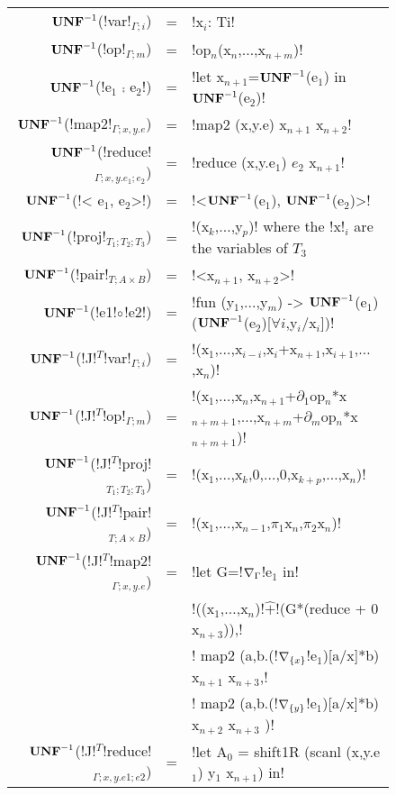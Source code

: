 \begin{figure*}[t]
    \begin{tabular}{|r c l|}
    \hline
    $\mathbf{UNF}^{-1}$(!var!$_{\Gamma;i}$) &=& !x$_i$: Ti! \\
    $\mathbf{UNF}^{-1}$(!op!$_{\Gamma;m}$) &=& !op$_n$(x$_n$,$\ldots$,x$_{n+m}$)! \\
    $\mathbf{UNF}^{-1}$(!e$_1$ $\comp$ e$_2$!) &=& !let x$_{n+1}$=$\mathbf{UNF}^{-1}$(e$_1$) in $\mathbf{UNF}^{-1}$(e$_2$)! \\
    $\mathbf{UNF}^{-1}$(!map2!$_{\Gamma;x,y.e}$) &=& !map2 (x,y.e) x$_{n+1}$ x$_{n+2}$! \\
    $\mathbf{UNF}^{-1}$(!reduce!$_{\Gamma;x,y.e_1;e_2}$) &=& !reduce (x,y.e$_1$) $e_2$ x$_{n+1}$! \\
    $\mathbf{UNF}^{-1}$(!< e$_1$, e$_2$>!) &=& !<$\mathbf{UNF}^{-1}$(e$_1$), $\mathbf{UNF}^{-1}$(e$_2$)>! \\
    $\mathbf{UNF}^{-1}$(!proj!$_{T_1;T_2;T_3}$) &=& !(x$_{k}$,$\ldots$,y$_{p}$)! where the !x!$_{i}$ are the variables of $T_3$ \\
    $\mathbf{UNF}^{-1}$(!pair!$_{T;A\times B}$) &=& !<x$_{n+1}$, x$_{n+2}$>! \\
    $\mathbf{UNF}^{-1}$(!e1!$\circ$!e2!) &=& !fun (y$_1$,$\ldots$,y$_m$) -> $\mathbf{UNF}^{-1}$(e$_1$)($\mathbf{UNF}^{-1}$(e$_2$)[$\forall i$,y$_i$/x$_i$])! \\
    $\mathbf{UNF}^{-1}$(!J!$^T$!var!$_{\Gamma;i}$) &=& !(x$_1$,$\ldots$,x$_{i-i}$,x$_i$+x$_{n+1}$,x$_{i+1}$,$\ldots$,x$_{n}$)! \\
    $\mathbf{UNF}^{-1}$(!J!$^T$!op!$_{\Gamma;m}$) &=& !(x$_1$,$\ldots$,x$_{n}$,x$_{n+1}$+$\partial_1$op$_n$*x$_{n+m+1}$,$\ldots$,x$_{n+m}$+$\partial_m$op$_n$*x$_{n+m+1}$)! \\
    $\mathbf{UNF}^{-1}$(!J!$^T$!proj!$_{T_1;T_2;T_3}$) &=& !(x$_1$,$\ldots$,x$_k$,0,$\ldots$,0,x$_{k+p}$,$\ldots$,x$_n$)! \\
    $\mathbf{UNF}^{-1}$(!J!$^T$!pair!$_{T;A\times B}$) &=& !(x$_1$,$\ldots$,x$_{n-1}$,$\pi_1$x$_n$,$\pi_2$x$_n$)! \\
    $\mathbf{UNF}^{-1}$(!J!$^T$!map2!$_{\Gamma;x,y.e}$) &=& 
    !let G=!$\nabla_{\Gamma}$!e$_{1}$ in!\\
    && !((x$_{1}$,$\ldots$,x$_n$)!$\widehat{+}$!(G*(reduce + 0 x$_{n+3}$)),!\\
    && ! map2 (a,b.(!$\nabla_{\{x\}}$!e$_{1}$)[a/x]*b) x$_{n+1}$ x$_{n+3}$,!\\
    && ! map2 (a,b.(!$\nabla_{\{y\}}$!e$_{1}$)[a/x]*b) x$_{n+2}$ x$_{n+3}$ )!\\
    $\mathbf{UNF}^{-1}$(!J!$^T$!reduce!$_{\Gamma;x,y.e1;e2}$) &=& !let A$_{0}$ = shift1R (scanl (x,y.e$_{1}$) y$_{1}$ x$_{n+1}$) in! \\

\end{tabular}
\end{figure*}
